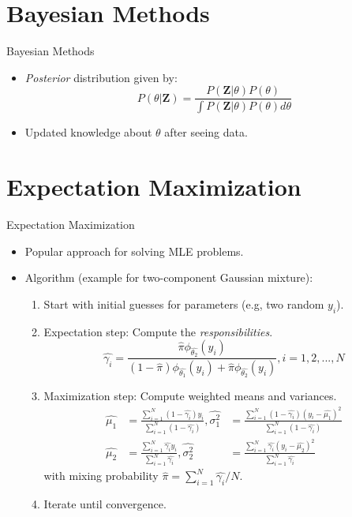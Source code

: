 \documentclass[aspectratio=169]{beamer}
\let \vec \mathbf
\begin{document}
\section{Bayesian Methods}


\begin{frame}{Bayesian Methods}
    \begin{itemize}
        \item \textit{Posterior} distribution given by:
        \begin{equation*}
            P(\theta|\vec{Z}) = \frac{P(\vec{Z}|\theta)P(\theta)}{\int{P(\vec{Z}|\theta)P(\theta)}d\theta}
        \end{equation*}
        \item Updated knowledge about $\theta$ after seeing data.
    \end{itemize}
\end{frame}


\section{Expectation Maximization}


\begin{frame}{Expectation Maximization}
    \begin{itemize}
        \item Popular approach for solving MLE problems.
        \item Algorithm (example for two-component Gaussian mixture):
        \begin{enumerate}
            \item Start with initial guesses for parameters (e.g, two random $y_i$).
            \item Expectation step: Compute the \textit{responsibilities}.
            \begin{equation*}
                \hat{\gamma_i} = \frac{\hat{\pi}\phi_{\hat{\theta_2}}(y_i)}{(1-\hat{\pi})\phi_{\hat{\theta_1}}(y_i) + \hat{\pi}\phi_{\hat{\theta_2}}(y_i)}, i=1,2,...,N
            \end{equation*}
            \item Maximization step: Compute weighted means and variances.
            \begin{eqnarray*}
            \hat{\mu_1}& = \frac{\sum_{i=1}^N (1-\hat{\gamma_i})y_i}{\sum_{i=1}^N (1-\hat{\gamma_i})}, \hat{\sigma_1^2}& = \frac{\sum_{i=1}^N (1-\hat{\gamma_i})(y_i-\hat{\mu_1})^2}{\sum_{i=1}^N (1-\hat{\gamma_i})}\\
            \hat{\mu_2}& =  \frac{\sum_{i=1}^N \hat{\gamma_i}y_i}{\sum_{i=1}^N \hat{\gamma_i}}, \hat{\sigma_2^2}& = \frac{\sum_{i=1}^N \hat{\gamma_i}(y_i-\hat{\mu_2})^2}{\sum_{i=1}^N \hat{\gamma_i}}
            \end{eqnarray*}
            with mixing probability $\hat{\pi} = \sum_{i=1}^N \hat{\gamma_i}/N$.
            \item Iterate until convergence.
        \end{enumerate}
    \end{itemize}
\end{frame}
\end{document}
